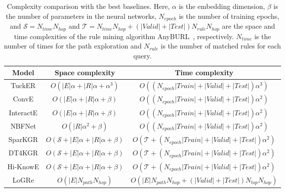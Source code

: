 \documentclass[sigconf]{acmart}
\begin{document}
\begin{table}[htb]
	\setlength{\tabcolsep}{1em}
	\centering
	\small
	\caption{Complexity comparison with the best baselines. Here, $\alpha$ is the embedding dimension, $\beta$ is the number of parameters in the neural networks, $N_{epoch}$ is the number of training epochs, and $\mathcal{S} = N_{time}N_{hop}$ and $\mathcal{T} = N_{time}N_{hop} + (|Valid| + |Test|) N_{rule} N_{hop}$ are the space and time complexities of the rule mining algorithm AnyBURL~\cite{AnyBURL}, respectively. $N_{time}$ is the number of times for the path exploration and $N_{rule}$ is the number of matched rules for each query.}
	\begin{tabular}{c|c|c}
		\toprule[1pt]
		Model &Space complexity &Time complexity\\
		\midrule[0.5pt]
		TuckER &$O(|E|\alpha+|R|\alpha+\alpha^3)$ &$O((N_{epoch} |Train| + |Valid| + |Test|)\alpha^3)$\\  %
		ConvE &$O(|E|\alpha+|R|\alpha+{\beta})$ &$O((N_{epoch} |Train| + |Valid| + |Test|) \alpha^2)$\\  %
		InteractE &$O(|E|\alpha+|R|\alpha+{\beta})$ &$O((N_{epoch} |Train| + |Valid| + |Test|) \alpha^2)$\\  %
		NBFNet &$O(|R|\alpha^2+\beta)$ &$O((N_{epoch} |Train| + |Valid| + |Test|) \alpha^2)$\\
		SparKGR &$O(\mathcal{S} +|E|\alpha+|R|\alpha+{\beta})$ &$O(\mathcal{T} + (N_{epoch} |Train| + |Valid| + |Test|) \alpha^2)$\\
		DT4KGR &$O(\mathcal{S}+|E|\alpha+|R|\alpha+{\beta})$ &$O(\mathcal{T} + (N_{epoch} |Train| + |Valid| + |Test|) \alpha^2)$\\
		Hi-KnowE &$O(\mathcal{S}+|E|\alpha+|R|\alpha+{\beta})$ &$O(\mathcal{T} + (N_{epoch} |Train| + |Valid| + |Test|) \alpha^2)$ \\
		LoGRe &$O(|E| N_{path} N_{hop})$ &$O(|E| N_{path} N_{hop} + (|Valid| + |Test|) N_{top} N_{hop})$\\
		\bottomrule[1pt]
	\end{tabular}
	\label{table:complexity}
\end{table}
\end{document}
